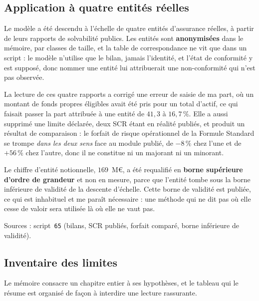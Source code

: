 \documentclass[12pt,a4paper]{article}
\theoremstyle{definition}
\begin{document}
\subsection{Application à quatre entités réelles}
\label{ss:entites}

Le modèle a été descendu à l'échelle de quatre entités d'assurance réelles, à
partir de leurs rapports de solvabilité publics. Les entités sont
\textbf{anonymisées} dans le mémoire, par classes de taille, et la table de
correspondance ne vit que dans un script : le modèle n'utilise que le bilan,
jamais l'identité, et l'état de conformité y est supposé, donc nommer une entité
lui attribuerait une non-conformité qui n'est pas observée.

La lecture de ces quatre rapports a corrigé une erreur de saisie de ma part, où un
montant de fonds propres éligibles avait été pris pour un total d'actif, ce qui
faisait passer la part attribuée à une entité de $41{,}3$ à $16{,}7\,\%$. Elle a
aussi supprimé une limite déclarée, deux SCR étant en réalité publiés, et produit
un résultat de comparaison : le forfait de risque opérationnel de la Formule
Standard se trompe \emph{dans les deux sens} face au module publié, de $-8\,\%$
chez l'une et de $+56\,\%$ chez l'autre, donc il ne constitue ni un majorant ni un
minorant.

Le chiffre d'entité notionnelle, $169$~M\euro, a été requalifié en \textbf{borne
supérieure d'ordre de grandeur} et non en mesure, parce que l'entité tombe sous la
borne inférieure de validité de la descente d'échelle. Cette borne de validité est
publiée, ce qui est inhabituel et me paraît nécessaire : une méthode qui ne dit pas
où elle cesse de valoir sera utilisée là où elle ne vaut pas.

\vspace{4pt}
\noindent Sources : script~\texttt{65} (bilans, SCR publiés, forfait comparé,
borne inférieure de validité).

\subsection{Inventaire des limites}
\label{ss:inventaire}

Le mémoire consacre un chapitre entier à ses hypothèses, et le tableau qui le
résume est organisé de façon à interdire une lecture rassurante.
\end{document}
